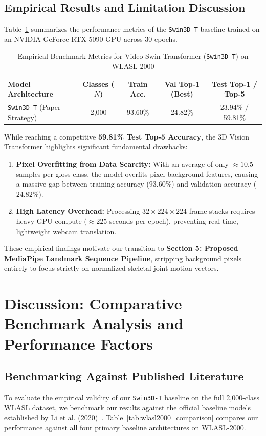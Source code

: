 \documentclass[12pt,a4paper]{article}
\begin{document}
\subsection{Empirical Results and Limitation Discussion}

Table~\ref{tab:swin_results} summarizes the performance metrics of the \texttt{Swin3D-T} baseline trained on an NVIDIA GeForce RTX 5090 GPU across 30 epochs.

\begin{table}[htbp]
\centering
\small
\caption{Empirical Benchmark Metrics for Video Swin Transformer (\texttt{Swin3D-T}) on WLASL-2000}
\label{tab:swin_results}
\begin{tabular}{lcccc}
\toprule
\textbf{Model Architecture} & \textbf{Classes ($N$)} & \textbf{Train Acc.} & \textbf{Val Top-1 (Best)} & \textbf{Test Top-1 / Top-5} \\
\midrule
\texttt{Swin3D-T} (Paper Strategy) & 2,000 & 93.60\% & 24.82\% & 23.94\% / 59.81\% \\
\bottomrule
\end{tabular}
\end{table}

While reaching a competitive \textbf{59.81\% Test Top-5 Accuracy}, the 3D Vision Transformer highlights significant fundamental drawbacks:
\begin{enumerate}
    \item \textbf{Pixel Overfitting from Data Scarcity:} With an average of only $\approx 10.5$ samples per gloss class, the model overfits pixel background features, causing a massive gap between training accuracy ($93.60\%$) and validation accuracy ($24.82\%$).
    \item \textbf{High Latency Overhead:} Processing $32 \times 224 \times 224$ frame stacks requires heavy GPU compute ($\approx 225$ seconds per epoch), preventing real-time, lightweight webcam translation.
\end{enumerate}

These empirical findings motivate our transition to \textbf{Section 5: Proposed MediaPipe Landmark Sequence Pipeline}, stripping background pixels entirely to focus strictly on normalized skeletal joint motion vectors.


\section{Discussion: Comparative Benchmark Analysis and Performance Factors}

\subsection{Benchmarking Against Published Literature}
To evaluate the empirical validity of our \texttt{Swin3D-T} baseline on the full 2,000-class WLASL dataset, we benchmark our results against the official baseline models established by Li et al. (2020)~\cite{li2020wlasl}. Table~\ref{tab:wlasl2000_comparison} compares our performance against all four primary baseline architectures on WLASL-2000.
\end{document}
